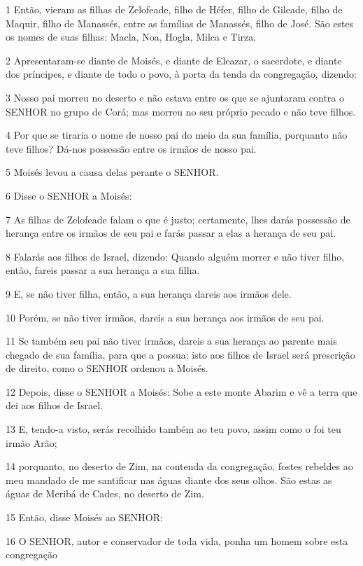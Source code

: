 \par 1 Então, vieram as filhas de Zelofeade, filho de Héfer, filho de Gileade, filho de Maquir, filho de Manassés, entre as famílias de Manassés, filho de José. São estes os nomes de suas filhas: Macla, Noa, Hogla, Milca e Tirza.
\par 2 Apresentaram-se diante de Moisés, e diante de Eleazar, o sacerdote, e diante dos príncipes, e diante de todo o povo, à porta da tenda da congregação, dizendo:
\par 3 Nosso pai morreu no deserto e não estava entre os que se ajuntaram contra o SENHOR no grupo de Corá; mas morreu no seu próprio pecado e não teve filhos.
\par 4 Por que se tiraria o nome de nosso pai do meio da sua família, porquanto não teve filhos? Dá-nos possessão entre os irmãos de nosso pai.
\par 5 Moisés levou a causa delas perante o SENHOR.
\par 6 Disse o SENHOR a Moisés:
\par 7 As filhas de Zelofeade falam o que é justo; certamente, lhes darás possessão de herança entre os irmãos de seu pai e farás passar a elas a herança de seu pai.
\par 8 Falarás aos filhos de Israel, dizendo: Quando alguém morrer e não tiver filho, então, fareis passar a sua herança a sua filha.
\par 9 E, se não tiver filha, então, a sua herança dareis aos irmãos dele.
\par 10 Porém, se não tiver irmãos, dareis a sua herança aos irmãos de seu pai.
\par 11 Se também seu pai não tiver irmãos, dareis a sua herança ao parente mais chegado de sua família, para que a possua; isto aos filhos de Israel será prescrição de direito, como o SENHOR ordenou a Moisés.
\par 12 Depois, disse o SENHOR a Moisés: Sobe a este monte Abarim e vê a terra que dei aos filhos de Israel.
\par 13 E, tendo-a visto, serás recolhido também ao teu povo, assim como o foi teu irmão Arão;
\par 14 porquanto, no deserto de Zim, na contenda da congregação, fostes rebeldes ao meu mandado de me santificar nas águas diante dos seus olhos. São estas as águas de Meribá de Cades, no deserto de Zim.
\par 15 Então, disse Moisés ao SENHOR:
\par 16 O SENHOR, autor e conservador de toda vida, ponha um homem sobre esta congregação
